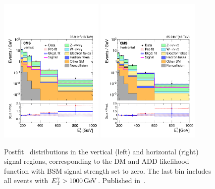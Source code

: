 \begin{figure}[htbp]
  \begin{center}
    \includegraphics[width=0.45\textwidth]{figures/exo16053/Figure_006-b.pdf}
    \includegraphics[width=0.45\textwidth]{figures/exo16053/Figure_006-a.pdf}
    \caption{
      Postfit \ETgamma\ distributions in the vertical (left) and horizontal (right) signal regions, corresponding
      to the DM and ADD likelihood function with BSM signal strength set to zero.
      The last bin includes all events with $\ETgamma > 1000\unit{GeV}$.
      Published in~\cite{ref:JHEP02(2019)074}.
    }
    \label{fig:postfitDM_SR}
  \end{center}
\end{figure}


